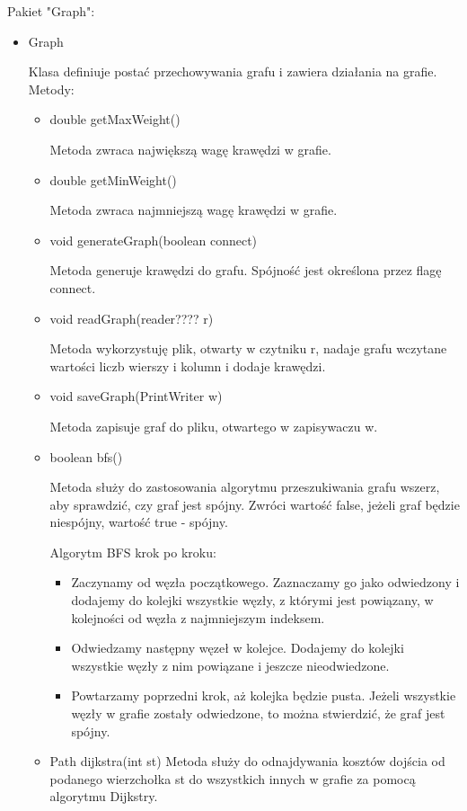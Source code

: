 \documentclass[]{article}
\begin{document}
Pakiet "Graph":
\begin{itemize}
    \item Graph
    
    Klasa definiuje postać przechowywania grafu i zawiera działania na grafie.
    Metody:
    \begin{itemize}
        \item double getMaxWeight()
        
        Metoda zwraca największą wagę krawędzi w grafie.
        \item double getMinWeight()
        
        Metoda zwraca najmniejszą wagę krawędzi w grafie.
        \item void generateGraph(boolean connect)
        
        Metoda generuje krawędzi do grafu. Spójność jest określona przez flagę connect.
        \item void readGraph(reader???? r)
        
        Metoda wykorzystuję plik, otwarty w czytniku r, nadaje grafu wczytane wartości liczb wierszy i kolumn i dodaje krawędzi.
        \item void saveGraph(PrintWriter w)
        
        Metoda zapisuje graf do pliku, otwartego w zapisywaczu w.
        \item boolean bfs()
        
        Metoda służy do zastosowania algorytmu przeszukiwania grafu wszerz, aby sprawdzić, czy graf jest spójny. Zwróci wartość false, jeżeli graf będzie niespójny, wartość true - spójny.
        
        Algorytm BFS krok po kroku:
        \begin{itemize}
            \item Zaczynamy od węzła początkowego. Zaznaczamy go jako odwiedzony i dodajemy do kolejki wszystkie węzły, z którymi jest powiązany, w kolejności od węzła z najmniejszym indeksem.
            \item Odwiedzamy następny węzeł w kolejce. Dodajemy do kolejki wszystkie węzły z nim powiązane i jeszcze nieodwiedzone.
            \item Powtarzamy poprzedni krok, aż kolejka będzie pusta. Jeżeli wszystkie węzły w grafie zostały odwiedzone, to można stwierdzić, że graf jest spójny.
        \end{itemize}
        \item Path dijkstra(int st)
        Metoda służy do odnajdywania kosztów dojścia od podanego wierzchołka st do wszystkich innych w grafie za pomocą algorytmu Dijkstry.
        

\end{itemize}
\end{itemize}
\end{document}

